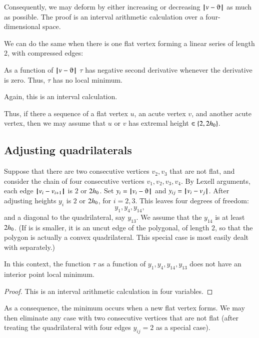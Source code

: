 Consequently, we may deform by either increasing or decreasing $\norm{v}{\orgn}$ as much as possible.  The proof is an interval arithmetic calculation over a four-dimensional space.


We can do the same when there is one flat vertex forming a linear series of length $2$, with compressed edges:

\begin{lemma}
As a function of $\norm{v}{\orgn}$
 $\tau$ has negative second derivative whenever the derivative is zero.  Thus, $\tau$ has no local minimum.
\end{lemma}

Again, this is an interval calculation.

Thus, if there a sequence of a flat vertex $u$, an acute vertex $v$, and another acute vertex, then we may assume that $u$ or $v$ has extremal height $\in\{2,2{h_0}\}$.



\subsection{Adjusting quadrilaterals}

Suppose that there are two consecutive vertices $v_2,v_3$ that are not flat,
and consider the chain of four consecutive vertices $v_1,v_2,v_3,v_4$.
By Lexell arguments, each edge ${\hskip0.1em|\hskip-0.15em|\hskip0.1em}v_i - v_{i+1}{\hskip0.1em|\hskip-0.15em|\hskip0.1em}$ is $2$ or $2{h_0}$.
Set $y_i = \norm{v_i}{\orgn}$ and $y_{ij} = {\hskip0.1em|\hskip-0.15em|\hskip0.1em}v_i - v_j{\hskip0.1em|\hskip-0.15em|\hskip0.1em}$.
After adjusting heights $y_i$ is $2$ or $2{h_0}$, for $i=2,3$.
This leaves four degrees of freedom:
$$
y_1,y_4,y_{14},
$$
and a diagonal to the quadrilateral, say $y_{13}$.
We assume that the $y_{14}$ is at least $2{h_0}$.  (If is is smaller, it is an uncut edge of the polygonal, of length $2$, so that the polygon is actually a convex quadrilateral.  This special case is most easily dealt with separately.)

\begin{lemma}
In this context, the function $\tau$ as a function of $y_1,y_4,y_{14},y_{13}$ does not have an interior point local minimum.
\end{lemma}

\begin{proof} This is an interval arithmetic calculation in four variables.
\end{proof}

As a consequence, the minimum occurs when a new flat vertex forms.  We may then eliminate any case with two consecutive vertices that are not flat (after treating the quadrilateral with four edges $y_{ij}=2$ as a special case).

